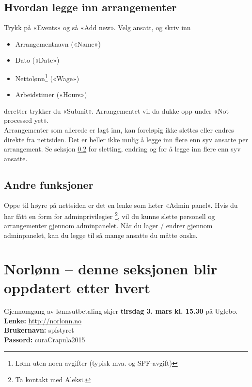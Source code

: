 \documentclass[12pt,norsk]{article}
\begin{document}
\subsection{Hvordan legge inn arrangementer}
\label{spfarr}

Trykk på «Events» og så «Add new». 
Velg ansatt, og skriv inn
\begin{itemize}
  \item Arrangementnavn («Name»)
  \item Dato («Date»)
  \item Nettolønn\footnote{Lønn uten noen avgifter 
    (typisk mva. og SPF-avgift)} («Wage»)
  \item Arbeidstimer («Hours»)
\end{itemize}

deretter trykker du «Submit». 
Arrangementet vil da dukke opp under «Not processed yet».\\

\noindent Arrangementer som 
allerede er lagt inn, kan foreløpig ikke slettes 
eller endres direkte fra nettsiden.
Det er heller ikke mulig å legge inn flere enn syv ansatte
per arrangement.
Se seksjon \ref{annet} for sletting, endring og for å legge inn
flere enn syv ansatte.
\subsection{Andre funksjoner}
\label{annet}

Oppe til høyre på nettsiden er det en lenke som heter «Admin panel». 
Hvis du har fått en form for adminprivilegier
\footnote{Ta kontakt med Aleksi.},
vil du kunne slette personell og arrangementer gjennom adminpanelet.
Når du lager / endrer gjennom admin\-panelet,
kan du legge til så mange ansatte du måtte ønske.

\section{Norlønn -- denne seksjonen blir oppdatert etter hvert}
Gjennomgang av lønnsutbetaling
skjer \textbf{tirsdag 3. mars kl. 15.30} på Uglebo.\\

\noindent \textbf{Lenke:} \url{http://norlonn.no}\\
\textbf{Brukernavn:} spfstyret\\
\textbf{Passord:} curaCrapula2015

\end{document}
